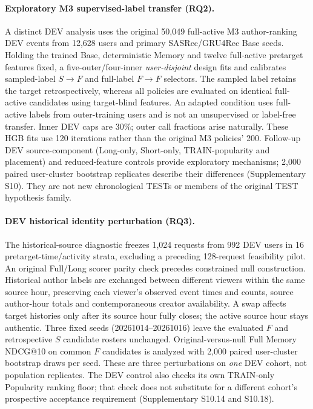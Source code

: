 \paragraph{Exploratory M3 supervised-label transfer (RQ2).}
A distinct DEV analysis uses the original 50,049 full-active M3 author-ranking DEV events from 12,628 users and primary SASRec/GRU4Rec Base seeds. Holding the trained Base, deterministic Memory and twelve full-active pretarget features fixed, a five-outer/four-inner \emph{user-disjoint} design fits and calibrates sampled-label $S\!\rightarrow\!F$ and full-label $F\!\rightarrow\!F$ selectors. The sampled label retains the target retrospectively, whereas all policies are evaluated on identical full-active candidates using target-blind features. An adapted condition uses full-active labels from outer-training users and is not an unsupervised or label-free transfer. Inner DEV caps are 30\%; outer call fractions arise naturally. These HGB fits use 120 iterations rather than the original M3 policies' 200. Follow-up DEV source-component (Long-only, Short-only, TRAIN-popularity and placement) and reduced-feature controls provide exploratory mechanisms; 2,000 paired user-cluster bootstrap replicates describe their differences (Supplementary S10). They are not new chronological TESTs or members of the original TEST hypothesis family.

\paragraph{DEV historical identity perturbation (RQ3).}
The historical-source diagnostic freezes 1,024 requests from 992 DEV users in 16 pretarget-time/activity strata, excluding a preceding 128-request feasibility pilot. An original Full/Long scorer parity check precedes constrained null construction. Historical author labels are exchanged between different viewers within the same source hour, preserving each viewer's observed event times and counts, source author-hour totals and contemporaneous creator availability. A swap affects target histories only after its source hour fully closes; the active source hour stays authentic. Three fixed seeds (20261014--20261016) leave the evaluated $F$ and retrospective $S$ candidate rosters unchanged. Original-versus-null Full Memory NDCG@10 on common $F$ candidates is analyzed with 2,000 paired user-cluster bootstrap draws per seed. These are three perturbations on \emph{one} DEV cohort, not population replicates. The DEV control also checks its own TRAIN-only Popularity ranking floor; that check does not substitute for a different cohort's prospective acceptance requirement (Supplementary S10.14 and S10.18).

